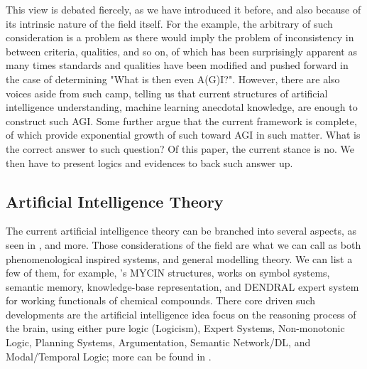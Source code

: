 This view is debated fiercely, as we have introduced it before, and also because of its intrinsic nature of the field itself. For the example, the arbitrary of such consideration is a problem as there would imply the problem of inconsistency in between criteria, qualities, and so on, of which has been surprisingly apparent as many times standards and qualities have been modified and pushed forward in the case of determining "What is then even A(G)I?". However, there are also voices aside from such camp, telling us that current structures of artificial intelligence understanding, machine learning anecdotal knowledge, are enough to construct such AGI. Some further argue that the current framework is complete, of which provide exponential growth of such toward AGI in such matter. What is the correct answer to such question? Of this paper, the current stance is no. We then have to present logics and evidences to back such answer up. 

\subsection{Artificial Intelligence Theory}

The current artificial intelligence theory can be branched into several aspects, as seen in \cite{Jackson2019,GoertzelPennachin2006,Chowdhary2020,10.5555/1671238}, and more. Those considerations of the field are what we can call as both phenomenological inspired systems, and general modelling theory. We can list a few of them, for example, \cite{shortliffe1976computer}'s MYCIN structures, \cite{newell1976computer} works on symbol systems, \cite{collins1969retrieval} semantic memory, \cite{davis1977production} knowledge-base representation, and \cite{Lindsay1993DENDRALAC} DENDRAL expert system for working functionals of chemical compounds. There core driven such developments are the artificial intelligence idea focus on the reasoning process of the brain, using either pure logic (Logicism), Expert Systems, Non-monotonic Logic, Planning Systems, Argumentation, Semantic Network/DL, and Modal/Temporal Logic; more can be found in \cite{math13111707}. 

